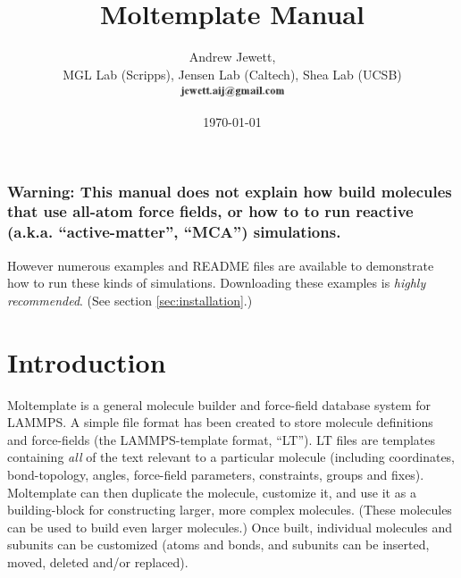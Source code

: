 \documentclass[11pt]{article}
\begin{document}
\author{
  Andrew Jewett, \\
  MGL Lab (Scripps), Jensen Lab (Caltech), Shea Lab (UCSB) \\
\includegraphics[height=0.3cm]{author_email.png}
}
\date \today


\title{Moltemplate Manual}



\maketitle


\tableofcontents


\subsubsection*{Warning:
  This manual does not explain how build molecules that use
  all-atom force fields, or how to to run reactive
  (a.k.a. ``active-matter'', ``MCA'') simulations.}
  
However numerous examples and README files are available to
demonstrate how to run these kinds of simulations.
Downloading these examples is \textit{highly recommended}.
(See section \ref{sec:installation}.)

\section{Introduction}



Moltemplate is a general molecule builder and force-field database system for LAMMPS.  A simple file format has been created to store molecule definitions and force-fields (the LAMMPS-template format, “LT”). 
LT files are templates containing \textit{all} of the text relevant to a particular molecule (including coordinates, bond-topology, angles, force-field parameters, constraints, groups and fixes).  Moltemplate can then duplicate the molecule, customize it, and use it as a building-block for constructing larger, more complex molecules.  (These molecules can be used to build even larger molecules.)  Once built, individual molecules and subunits can be customized (atoms and bonds, and subunits can be inserted, moved, deleted and/or replaced).
\end{document}

